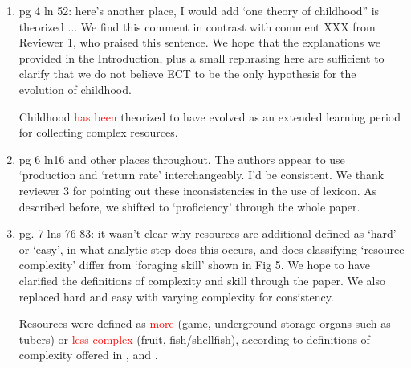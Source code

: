 \documentclass{article}
\newcommand{\rev}[1]{{\color{ForestGreen}#1}}
\begin{document}
\begin{enumerate}
    \item pg 4 ln 52: here’s another place, I would add ‘one theory of childhood” is theorized ...
    \rev{We find this comment in contrast with comment XXX from Reviewer 1, who praised this sentence. We hope that the explanations we provided in the Introduction, plus a small rephrasing here are sufficient to clarify that we do not believe ECT to be the only hypothesis for the evolution of childhood.}
    \begin{displayquote}
    Childhood \textcolor{red}{has been} theorized to have evolved as an extended learning period for collecting complex resources.
    \end{displayquote}
    
    \item pg 6 ln16 and other places throughout. The authors appear to use ‘production and ‘return rate’ interchangeably. I’d be consistent.
    \rev{We thank reviewer 3 for pointing out these inconsistencies in the use of lexicon. As described before, we shifted to `proficiency' through the whole paper. }
    
    \item pg. 7 lns 76-83: it wasn’t clear why resources are additional defined as ‘hard’ or ‘easy’, in what analytic step does this occurs, and does classifying ‘resource complexity’ differ from ‘foraging skill’ shown in Fig 5.
    \rev{We hope to have clarified the definitions of complexity and skill through the paper. We also replaced hard and easy with varying complexity for consistency. }
    \begin{displayquote}
    Resources were defined as \textcolor{red}{more} (game, underground storage organs such as tubers) or \textcolor{red}{less complex} (fruit, fish/shellfish), according to definitions of complexity offered in \citet{johnson_trade-offs_2004}, \citet{lancaster_evolution_2000} and \citet{ schuppli_life_2016}. 
    \end{displayquote}
    

\end{enumerate}
\end{document}
